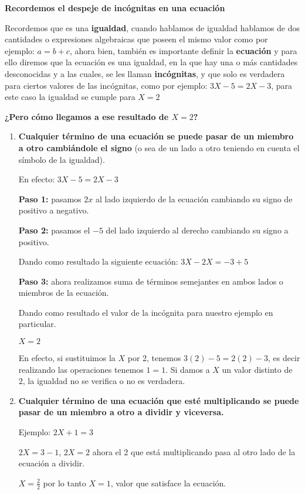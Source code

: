 \documentclass[12pt,a4paper]{article}
\begin{document}
\begin{tcolorbox}[colback=fondoazul,colframe=azuloscuro,title=RECUERDA QUE...]

\textbf{Recordemos el despeje de incógnitas en una ecuación}

Recordemos que es una \textbf{igualdad}, cuando hablamos de igualdad hablamos de dos cantidades o expresiones algebraicas que poseen el mismo valor como por ejemplo: $a = b+c$, ahora bien, también es importante definir la \textbf{ecuación} y para ello diremos que la ecuación es una igualdad, en la que hay una o más cantidades desconocidas y a las cuales, se les llaman \textbf{incógnitas}, y que solo es verdadera para ciertos valores de las incógnitas, como por ejemplo: $3X - 5 = 2X - 3$, para este caso la igualdad se cumple para $X = 2$

\textbf{¿Pero cómo llegamos a ese resultado de $X = 2$?}

\begin{enumerate}
    \item \textbf{Cualquier término de una ecuación se puede pasar de un miembro a otro cambiándole el signo} (o sea de un lado a otro teniendo en cuenta el símbolo de la igualdad).

    En efecto: $3X - 5 = 2X - 3$

    \textbf{Paso 1:} pasamos $2x$ al lado izquierdo de la ecuación cambiando su signo de positivo a negativo.

    \textbf{Paso 2:} pasamos el $-5$ del lado izquierdo al derecho cambiando su signo a positivo.

    Dando como resultado la siguiente ecuación: $3X - 2X = -3 + 5$

    \textbf{Paso 3:} ahora realizamos suma de términos semejantes en ambos lados o miembros de la ecuación.

    Dando como resultado el valor de la incógnita para nuestro ejemplo en particular.

    $X = 2$

    En efecto, si sustituimos la $X$ por 2, tenemos $3(2) - 5 = 2(2) - 3$, es decir realizando las operaciones tenemos $1 = 1$. Si damos a $X$ un valor distinto de 2, la igualdad no se verifica o no es verdadera.

    \item \textbf{Cualquier término de una ecuación que esté multiplicando se puede pasar de un miembro a otro a dividir y viceversa.}

    Ejemplo: $2X + 1 = 3$

    $2X = 3 - 1$, $2X = 2$ ahora el 2 que está multiplicando pasa al otro lado de la ecuación a dividir.

    $X = \frac{2}{2}$ por lo tanto $X = 1$, valor que satisface la ecuación.
\end{enumerate}

\end{tcolorbox}
\end{document}
